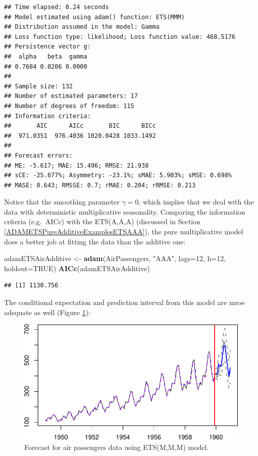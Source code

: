 \documentclass[]{book}
\newenvironment{Shaded}{\begin{snugshade}}{\end{snugshade}}
\newcommand{\DataTypeTok}[1]{\textcolor[rgb]{0.13,0.29,0.53}{#1}}
\newcommand{\DecValTok}[1]{\textcolor[rgb]{0.00,0.00,0.81}{#1}}
\newcommand{\KeywordTok}[1]{\textcolor[rgb]{0.13,0.29,0.53}{\textbf{#1}}}
\newcommand{\NormalTok}[1]{#1}
\newcommand{\OtherTok}[1]{\textcolor[rgb]{0.56,0.35,0.01}{#1}}
\newcommand{\StringTok}[1]{\textcolor[rgb]{0.31,0.60,0.02}{#1}}
\theoremstyle{definition}
\theoremstyle{definition}
\theoremstyle{definition}
\theoremstyle{definition}
\theoremstyle{remark}
\begin{document}
\begin{verbatim}
## Time elapsed: 0.24 seconds
## Model estimated using adam() function: ETS(MMM)
## Distribution assumed in the model: Gamma
## Loss function type: likelihood; Loss function value: 468.5176
## Persistence vector g:
##  alpha   beta  gamma 
## 0.7684 0.0206 0.0000 
## 
## Sample size: 132
## Number of estimated parameters: 17
## Number of degrees of freedom: 115
## Information criteria:
##       AIC      AICc       BIC      BICc 
##  971.0351  976.4036 1020.0428 1033.1492 
## 
## Forecast errors:
## ME: -5.617; MAE: 15.496; RMSE: 21.938
## sCE: -25.677%; Asymmetry: -23.1%; sMAE: 5.903%; sMSE: 0.698%
## MASE: 0.643; RMSSE: 0.7; rMAE: 0.204; rRMSE: 0.213
\end{verbatim}

Notice that the smoothing parameter \(\gamma=0\), which implies that we deal with the data with deterministic multiplicative seasonality. Comparing the information criteria (e.g.~AICc) with the ETS(A,A,A) (discussed in Section \ref{ADAMETSPureAdditiveExamplesETSAAA}), the pure multiplicative model does a better job at fitting the data than the additive one:

\begin{Shaded}
\begin{Highlighting}[]
\NormalTok{adamETSAirAdditive <-}\StringTok{ }\KeywordTok{adam}\NormalTok{(AirPassengers, }\StringTok{"AAA"}\NormalTok{, }\DataTypeTok{lags=}\DecValTok{12}\NormalTok{,}
                           \DataTypeTok{h=}\DecValTok{12}\NormalTok{, }\DataTypeTok{holdout=}\OtherTok{TRUE}\NormalTok{)}
\KeywordTok{AICc}\NormalTok{(adamETSAirAdditive)}
\end{Highlighting}
\end{Shaded}

\begin{verbatim}
## [1] 1130.756
\end{verbatim}

The conditional expectation and prediction interval from this model are mroe adequate as well (Figure \ref{fig:AirPassengersMMMForecast}):

\begin{figure}
\centering
\includegraphics{Svetunkov--2022----ADAM_files/figure-latex/AirPassengersMMMForecast-1.pdf}
\caption{\label{fig:AirPassengersMMMForecast}Forecast for air passengers data using ETS(M,M,M) model.}
\end{figure}
\end{document}
